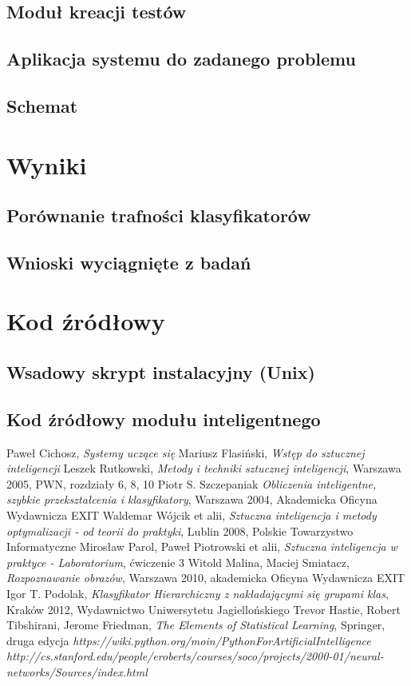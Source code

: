 \documentclass[12pt,a4paper,oneside]{report} %
\begin{document}
\subsection{Moduł kreacji testów}
\subsection{Aplikacja systemu do zadanego problemu}
\subsection{Schemat}
\section{Wyniki}
\subsection{Porównanie trafności klasyfikatorów}
\subsection{Wnioski wyciągnięte z badań}
\section{Kod źródłowy}
\subsection{Wsadowy skrypt instalacyjny (Unix)}
\subsection{Kod źródłowy modułu inteligentnego}


\begin{thebibliography}{9}
 Paweł Cichosz, \emph{Systemy uczące się}
 Mariusz Flasiński, \emph{Wstęp do sztucznej inteligencji}
 Leszek Rutkowski, \emph{Metody i techniki sztucznej inteligencji}, Warszawa 2005, PWN, rozdziały 6, 8, 10
 Piotr S. Szczepaniak \emph{Obliczenia inteligentne, szybkie przekształcenia i klasyfikatory}, Warszawa 2004, Akademicka Oficyna Wydawnicza EXIT
 Waldemar Wójcik et alii, \emph{Sztuczna inteligencja i metody optymalizacji - od teorii do praktyki}, Lublin 2008, Polskie Towarzystwo Informatyczne
 Mirosław Parol, Paweł Piotrowski et alii, \emph{Sztuczna inteligencja w praktyce - Laboratorium}, ćwiczenie 3
 Witold Malina, Maciej Smiatacz, \emph{Rozpoznawanie obrazów}, Warszawa 2010, akademicka Oficyna Wydawnicza EXIT
 Igor T. Podolak, \emph{Klasyfikator Hierarchiczny z nakładającymi się grupami klas}, Kraków 2012, Wydawnictwo Uniwersytetu Jagiellońskiego
 Trevor Hastie, Robert Tibshirani, Jerome Friedman, \emph{The Elements of Statistical Learning}, Springer, druga edycja
 \emph{https://wiki.python.org/moin/PythonForArtificialIntelligence}
 \emph{http://cs.stanford.edu/people/eroberts/courses/soco/projects/2000-01/neural-networks/Sources/index.html}
\end{thebibliography}
\end{document}
